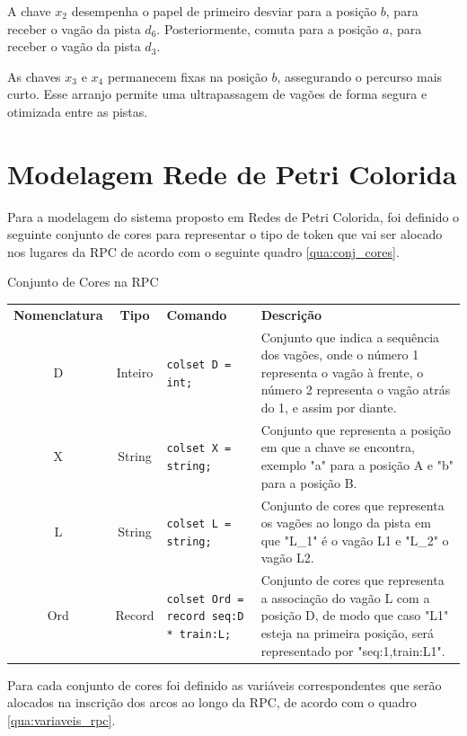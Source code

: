 A chave $x_2$ desempenha o papel de primeiro desviar para a posição $b$, para receber o vagão da pista $d_6$. Posteriormente, comuta para a posição $a$, para receber o vagão da pista $d_3$.

As chaves $x_3$ e $x_4$ permanecem fixas na posição $b$, assegurando o percurso mais curto. Esse arranjo permite uma ultrapassagem de vagões de forma segura e otimizada entre as pistas.

\section{Modelagem Rede de Petri Colorida}
Para a modelagem do sistema proposto em Redes de Petri Colorida, foi definido o seguinte conjunto de cores para representar o tipo de token que vai ser alocado nos lugares da RPC de acordo com o seguinte quadro \ref{qua:conj_cores}.

\begin{quadro}[h]
\centering
\caption{Conjunto de Cores na RPC}
\begin{tabularx}{\textwidth}{|c|c|X|X|}
\hline
\textbf{Nomenclatura} & \textbf{Tipo}    & \textbf{Comando}                             & \textbf{Descrição} \\
\cline{1-4}
D & Inteiro & \texttt{colset D = int;} 
& Conjunto que indica a sequência dos vagões, onde o número 1 representa o vagão à frente, o número 2 representa o vagão atrás do 1, e assim por diante. \\ 
\cline{1-4}
X & String  & \texttt{colset X = string;} 
& Conjunto que representa a posição em que a chave se encontra, exemplo "a" para a posição A e "b" para a posição B. \\
\cline{1-4}
L & String  & \texttt{colset L = string;}         
& Conjunto de cores que representa os vagões ao longo da pista em que "L\_1" é o vagão L1 e "L\_2" o vagão L2. \\
\cline{1-4}
Ord & Record  & \texttt{colset Ord = record seq:D * train:L;} 
& Conjunto de cores que representa a associação do vagão L com a posição D,
de modo que caso "L1" esteja na primeira posição, será representado por "seq:1,train:L1". \\ 
\cline{1-4}

\end{tabularx}
\label{qua:conj_cores}
\end{quadro}

 Para cada conjunto de cores foi definido as variáveis correspondentes que serão alocados na inscrição dos arcos ao longo da RPC, de acordo com o quadro \ref{qua:variaveis_rpc}.

